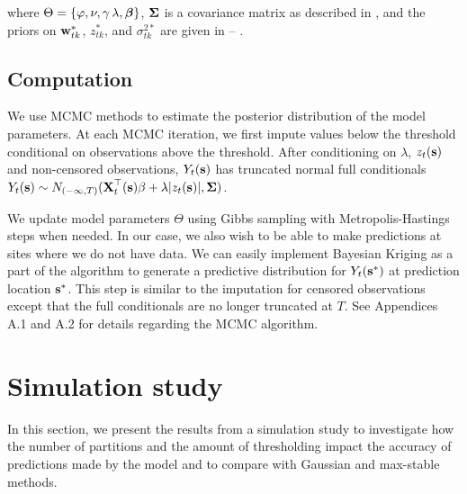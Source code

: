 \documentclass[useAMS,usenatbib,referee]{biom}
\begin{document}
where $\Theta = \{\varphi, \nu, \gamma\, \lambda, \mbox{\boldmath $\beta$}\}$, $\mbox{\boldmath $\Sigma$}$ is a \Matern covariance matrix as described in , and the priors on $\mbox{\bf w}^*_{tk}$, $z^*_{tk}$, and $\sigma^{2*}_{tk}$ are given in  -- .

\subsection{Computation}\label{sts:comp}
We use MCMC methods to estimate the posterior distribution of the model parameters.
At each MCMC iteration, we first impute values below the threshold conditional on observations above the threshold.
After conditioning on $\lambda$, $z_t(\mbox{\bf s})$ and non-censored observations, $Y_t(\mbox{\bf s})$ has truncated normal full conditionals $Y_t(\mbox{\bf s}) \sim N_{(-\infty, T)}(\mbox{\bf X}_t^\top(\mbox{\bf s}) \beta + \lambda | z_t(\mbox{\bf s})|, \mbox{\boldmath $\Sigma$})$.

We update model parameters $\Theta$ using Gibbs sampling with Metropolis-Hastings steps when needed.
In our case, we also wish to be able to make predictions at sites where we do not have data.
We can easily implement Bayesian Kriging as a part of the algorithm to generate a predictive distribution for $Y_t(\mbox{\bf s}^*)$ at prediction location $\mbox{\bf s}^*$.
This step is similar to the imputation for censored observations except that the full conditionals are no longer truncated at $T$.
See Appendices A.1 and A.2 for details regarding the MCMC algorithm.

\section{Simulation study}\label{sts:simstudy}
In this section, we present the results from a simulation study to investigate how the number of partitions and the amount of thresholding impact the accuracy of predictions made by the model and to compare with Gaussian and max-stable methods.
\end{document}
